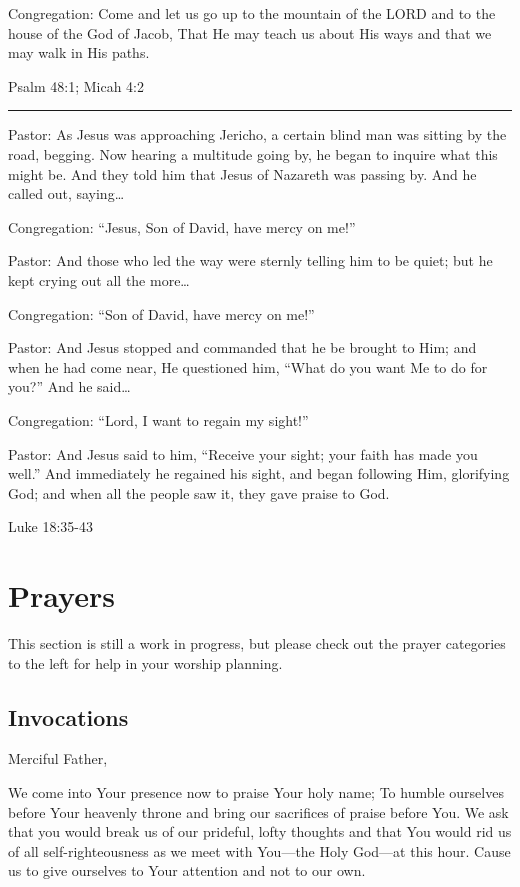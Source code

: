 \documentclass[]{book}
\begin{document}
Congregation: Come and let us go up to the mountain of the LORD and to the house of the God of Jacob, That He may teach us about His ways and that we may walk in His paths.

Psalm 48:1; Micah 4:2 \textbar{}

\begin{center}\rule{0.5\linewidth}{\linethickness}\end{center}

Pastor: As Jesus was approaching Jericho, a certain blind man was sitting by the road, begging. Now hearing a multitude going by, he began to inquire what this might be. And they told him that Jesus of Nazareth was passing by. And he called out, saying\ldots{}

Congregation: ``Jesus, Son of David, have mercy on me!''

Pastor: And those who led the way were sternly telling him to be quiet; but he kept crying out all the more\ldots{}

Congregation: ``Son of David, have mercy on me!''

Pastor: And Jesus stopped and commanded that he be brought to Him; and when he had come near, He questioned him, ``What do you want Me to do for you?'' And he said\ldots{}

Congregation: ``Lord, I want to regain my sight!''

Pastor: And Jesus said to him, ``Receive your sight; your faith has made you well.'' And immediately he regained his sight, and began following Him, glorifying God; and when all the people saw it, they gave praise to God.

Luke 18:35-43 \textbar{}

\hypertarget{prayers}{%
\chapter{Prayers}\label{prayers}}

This section is still a work in progress, but please check out the prayer categories to the left for help in your worship planning.

\hypertarget{invocations}{%
\section{Invocations}\label{invocations}}

Merciful Father,

We come into Your presence now to praise Your holy name; To humble ourselves before Your heavenly throne and bring our sacrifices of praise before You. We ask that you would break us of our prideful, lofty thoughts and that You would rid us of all self-righteousness as we meet with You---the Holy God---at this hour. Cause us to give ourselves to Your attention and not to our own.
\end{document}
